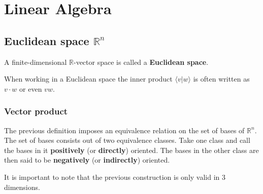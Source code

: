 \chapter{Linear Algebra}






\section{Euclidean space \texorpdfstring{$\mathbb{R}^n$}\ }

	A finite-dimensional $\mathbb{R}$-vector space is called a \textbf{Euclidean space}.

        \begin{notation}
		When working in a Euclidean space the inner product $\langle v|w\rangle$ is often written as $v\cdot w$ or even $vw$.
	\end{notation}
        
\subsection{Vector product}

        \begin{result}
        	The previous definition imposes an equivalence relation on the set of bases of $\mathbb{R}^n$. The set of bases consists out of two equivalence classes. Take one class and call the bases in it \textbf{positively} (or \textbf{directly}) oriented. The bases in the other class are then said to be \textbf{negatively} (or \textbf{indirectly}) oriented.
        \end{result}
        
        \begin{remark}
        	It is important to note that the previous construction is only valid in 3 dimensions.
	\end{remark}
